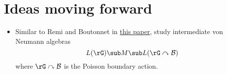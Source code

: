 \documentclass[../main.tex]{subfiles}
\begin{document}
\section{Ideas moving forward}

\begin{itemize}
    \item Similar to Remi and Boutonnet in \href{https://arxiv.org/pdf/2207.13548.pdf}{this paper}, study intermediate von Neumann algebras
        \[
            L(\rG) \sub M \sub L(\rG \curvearrowright \mathcal{B})
        \]
        where $\rG \curvearrowright \mathcal{B} $ is the Poisson boundary action.
\end{itemize}
\end{document}
